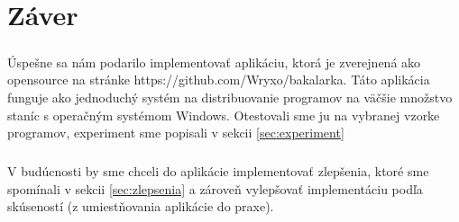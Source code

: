 \chapter*{Záver}
\paragraph{}
Úspešne sa nám podarilo implementovať aplikáciu, ktorá je zverejnená ako opensource na stránke https://github.com/Wryxo/bakalarka. Táto aplikácia funguje ako jednoduchý systém na distribuovanie programov na väčšie množstvo staníc s operačným systémom Windows. Otestovali sme ju na vybranej vzorke programov, experiment sme popisali v sekcii \ref{sec:experiment}
\paragraph{}
V budúcnosti by sme chceli do aplikácie implementovať zlepšenia, ktoré sme spomínali v sekcii \ref{sec:zlepsenia} a zároveň vylepšovať implementáciu podľa skúseností (z umiestňovania aplikácie do praxe).